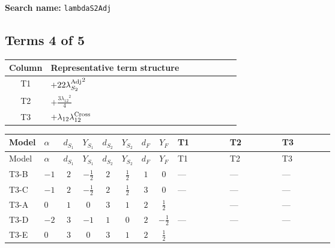 \documentclass[8pt]{article}
\begin{document}
\begin{landscape}
\begin{longtable}{@{}llcccccc >{\raggedright\arraybackslash}p{0.21\linewidth} >{\raggedright\arraybackslash}p{0.21\linewidth} >{\raggedright\arraybackslash}p{0.21\linewidth}@{}}
\midrule
\bottomrule
\end{longtable}
\clearpage
\noindent\textbf{Search name: }\texttt{lambdaS2Adj}\par\smallskip
\subsection*{Terms 4 of 5}
\begin{center}
\begin{tabular}{@{}c >{\raggedright\arraybackslash}p{0.82\linewidth}@{}}
\toprule
Column & Representative term structure \\
\midrule
T1 & \(\displaystyle +22 {\lambda_{S_2}^{\rm Adj}}^2\) \\
\midrule
T2 & \(\displaystyle +\frac{3 {\lambda_{12}}^2}{4}\) \\
\midrule
T3 & \(\displaystyle +{\lambda_{12}} {\lambda_{12}^{\rm Cross}}\) \\
\midrule
\bottomrule
\end{tabular}
\end{center}
\smallskip
\tiny
\begin{longtable}{@{}llcccccc >{\raggedright\arraybackslash}p{0.21\linewidth} >{\raggedright\arraybackslash}p{0.21\linewidth} >{\raggedright\arraybackslash}p{0.21\linewidth}@{}}
\toprule
Model & $\alpha$ & $d_{S_1}$ & $Y_{S_1}$ & $d_{S_2}$ & $Y_{S_2}$ & $d_F$ & $Y_F$ & T1 & T2 & T3 \\
\midrule
\endfirsthead
\toprule
Model & $\alpha$ & $d_{S_1}$ & $Y_{S_1}$ & $d_{S_2}$ & $Y_{S_2}$ & $d_F$ & $Y_F$ & T1 & T2 & T3 \\
\midrule
\endhead
T3-B & $-1$ & $2$ & $-\frac{1}{2}$ & $2$ & $\frac{1}{2}$ & $1$ & $0$ & --- & --- & --- \\
\midrule
T3-C & $-1$ & $2$ & $-\frac{1}{2}$ & $2$ & $\frac{1}{2}$ & $3$ & $0$ & --- & --- & --- \\
\midrule
T3-A & $0$ & $1$ & $0$ & $3$ & $1$ & $2$ & $\frac{1}{2}$ & \scriptsize\adjustbox{max width=\linewidth}{$\begin{gathered} +22 {\lambda_{S_2}^{\rm Adj}}^2\end{gathered}$} & --- & --- \\
\midrule
T3-D & $-2$ & $3$ & $-1$ & $1$ & $0$ & $2$ & $-\frac{1}{2}$ & --- & --- & --- \\
\midrule
T3-E & $0$ & $3$ & $0$ & $3$ & $1$ & $2$ & $\frac{1}{2}$ & \scriptsize\adjustbox{max width=\linewidth}{$\begin{gathered} +22 {\lambda_{S_2}^{\rm Adj}}^2\end{gathered}$} & \scriptsize\adjustbox{max width=\linewidth}{$\begin{gathered} +\frac{3 {\lambda_{12}}^2}{4}\end{gathered}$} & \scriptsize\adjustbox{max width=\linewidth}{$\begin{gathered} +{\lambda_{12}} {\lambda_{12}^{\rm Cross}}\end{gathered}$} \\

\end{longtable}
\end{landscape}
\end{document}
